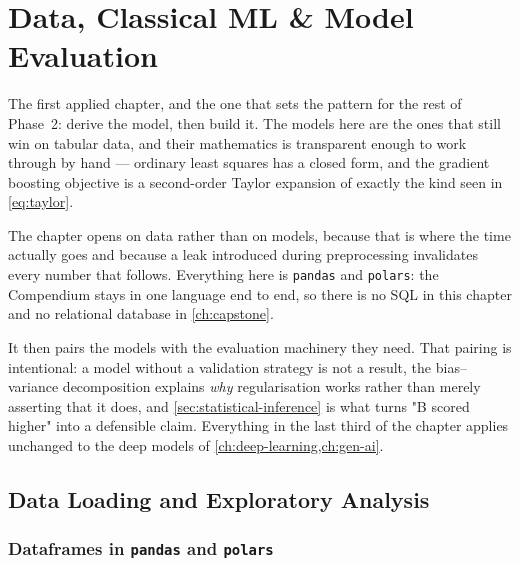 %
\chapter{Data, Classical ML \& Model Evaluation}
\label{ch:classical-ml}

The first applied chapter, and the one that sets the pattern for the rest of
Phase~2: derive the model, then build it. The models here are the ones that
still win on tabular data, and their mathematics is transparent enough to work
through by hand --- ordinary least squares has a closed form, and the gradient
boosting objective is a second-order Taylor expansion of exactly the kind seen
in \cref{eq:taylor}.

The chapter opens on data rather than on models, because that is where the time
actually goes and because a leak introduced during preprocessing invalidates
every number that follows. Everything here is \texttt{pandas} and
\texttt{polars}: the Compendium stays in one language end to end, so there is no
SQL in this chapter and no relational database in \cref{ch:capstone}.

It then pairs the models with the evaluation machinery they need. That pairing
is intentional: a model without a validation strategy is not a result, the
bias--variance decomposition explains \emph{why} regularisation works rather
than merely asserting that it does, and \cref{sec:statistical-inference} is what
turns "B scored higher" into a defensible claim. Everything in the last third of
the chapter applies unchanged to the deep models of
\cref{ch:deep-learning,ch:gen-ai}.

\section{Data Loading and Exploratory Analysis}
\label{sec:eda}

\subsection{Dataframes in \texttt{pandas} and \texttt{polars}}

